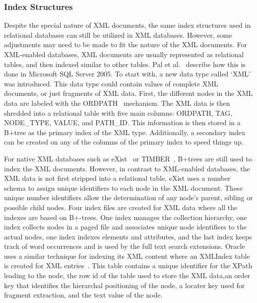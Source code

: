 \documentclass[12pt,a4paper]{article}
\begin{document}
\subsubsection{Index Structures}

Despite the special nature of XML documents, the same index structures used in relational databases can still be utilized in XML databases. However, some
adjustments may need to be made to fit the nature of the XML documents. For XML-enabled databases, XML documents are usually represented as relational tables,
and then indexed similar to other tables. Pal et al.~\cite{pal2004indexing} describe how this is done in Microsoft SQL Server 2005. To start with, a new data
type called `XML' was introduced. This data type could contain values of complete XML documents, or just fragments of XML data. First, the different nodes in
the XML data are labeled with the ORDPATH~\cite{o2004ordpaths} mechanism. The XML data is then shredded into a relational table with five main columns: ORDPATH,
TAG, NODE\_TYPE, VALUE, and PATH\_ID. This information is then stored in a B+tree as the primary index of the XML type. Additionally, a secondary index
can be created on any of the columns of the primary index to speed things up.


For native XML databases such as eXist~\cite{meier2009exist} or TIMBER~\cite{jagadish2002timber}, B+trees are still used to index the XML documents.
However, in contrast to XML-enabled databases, the XML data is not first stripped into a relational table. eXist uses a number schema to assign unique
identifiers to each node in the XML document. These unique number identifiers allow the determination of any node's parent, sibling or possible child nodes.
Four index files are created for XML data where all the indexes are based on B+-trees. One index manages the collection hierarchy, one index collects nodes
in a paged file and associates unique node identifiers to the actual nodes, one index indexes elements and attributes, and the last index keeps track of word
occurrences and is used by the full text search extensions. Oracle uses a similar technique for indexing its XML content where an XMLIndex table is created for
XML entries~\cite{oracleXML}. This table contains a unique identifier for the XPath leading to the node, the row id of the table used to store the XML data,an
order key that identifies the hierarchal positioning of the node, a locater key used for fragment extraction, and the text value of the node.
\end{document}
